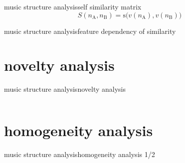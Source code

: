         \begin{frame}{music structure analysis}{self similarity matrix}
            \begin{equation*}
                S(n_\mathrm{A}, n_\mathrm{B}) = \mathrm{s}\big(v(n_\mathrm{A}),v(n_\mathrm{B})\big)
            \end{equation*}
            \vspace{-5mm}
            
        \end{frame}
        \begin{frame}{music structure analysis}{feature dependency of similarity}
        \end{frame}
    \section[novelty]{novelty analysis}
        \begin{frame}{music structure analysis}{novelty analysis}
            \begin{columns}
            \end{columns}
        \end{frame}
    \section[homogeneity]{homogeneity analysis}
        \begin{frame}{music structure analysis}{homogeneity analysis 1/2}
        \end{frame}
        
